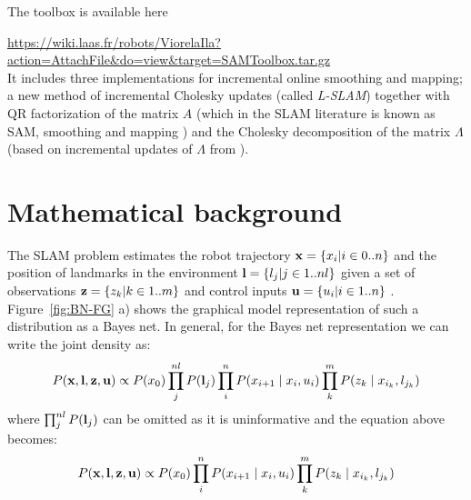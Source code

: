 \documentclass{article}
\begin{document}
The toolbox is available here\\ {\small {\url{https://wiki.laas.fr/robots/ViorelaIla?action=AttachFile&do=view&target=SAMToolbox.tar.gz}}\\ \normalsize It includes three implementations for incremental online smoothing and mapping; a new method of incremental Cholesky updates (called \emph{ L-SLAM}) together with QR factorization of the matrix $A$ (which in the SLAM literature is known as SAM, smoothing and mapping \cite{Dellaert06ijrr}) and the Cholesky decomposition of the matrix $\Lambda$ (based on incremental updates of $\Lambda$ from \cite{Ila10tro}).


\newpage
\thispagestyle{empty}

\section{Mathematical background}
%
The SLAM problem estimates the robot trajectory ${\bf x} =\left\{ x_{i}|i\in0..n\right\} $ and the position of landmarks in the environment ${\bf l} =\left\{ l_{j}|j\in1..nl\right\} $  given a set of observations ${\bf z} =\left\{ z_{k}|k\in1..m\right\}$ and control inputs ${\bf u} =\left\{ u_{i}|i\in1..n\right\}$  . Figure~\ref{fig:BN-FG} a) shows the graphical model representation of such a distribution as a Bayes net. In general, for the Bayes net representation we can write the joint density as:
%
\begin{equation}
P({\bf x},{\bf l},{\bf z},{\bf u})\propto P(x_{0})\prod_{j}^{nl} P({\bf l}_{j})\prod_{i}^{n} P(x_{i+1}\mid x_{i},u_{i})\prod_{k}^{m} P(z_{k}\mid x_{i_k},l_{j_k}) 
\end{equation}
%
where $\prod_{j}^{nl} P({\bf l}_{j})$ can be omitted as it is uninformative and the equation above becomes:
%
\begin{equation}
P({\bf x},{\bf l},{\bf z},{\bf u})\propto P(x_{0})\prod_{i}^{n} P(x_{i+1}\mid x_{i},u_{i})\prod_{k}^{m} P(z_{k}\mid x_{i_k},l_{j_k}) 
\end{equation}
}
\end{document}

